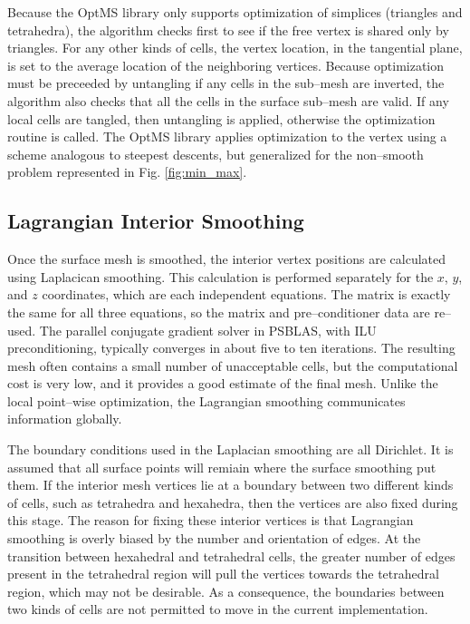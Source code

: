 \documentclass[a4paper,12pt,notitlepage]{article}
\begin{document}
Because the OptMS library only supports optimization of simplices
(triangles and tetrahedra), the algorithm checks first to see if the
free vertex is shared only by triangles.  For any other kinds of
cells, the vertex location, in the tangential plane, is set to the
average location of the neighboring vertices.  Because optimization
must be preceeded by untangling if any cells in the sub--mesh are
inverted, the algorithm also checks that all the cells in the surface
sub--mesh are valid.  If any local cells are tangled, then untangling
is applied, otherwise the optimization routine is called.  The OptMS
library applies optimization to the vertex using a scheme analogous to
steepest descents, but generalized for the non--smooth problem
represented in Fig. \ref{fig:min_max}.

\subsection{Lagrangian Interior Smoothing}
Once the surface mesh is smoothed, the interior vertex positions are
calculated using Laplacican smoothing.  This calculation is performed
separately for the $x$, $y$, and $z$ coordinates, which are each
independent equations.  The matrix is exactly the same for all three
equations, so the matrix and pre--conditioner data are re--used.  The
parallel conjugate gradient solver in PSBLAS, with ILU
preconditioning, typically converges in about five to ten iterations.
The resulting mesh often contains a small number of unacceptable
cells, but the computational cost is very low, and it provides a good
estimate of the final mesh.  Unlike the local point--wise optimization,
the Lagrangian smoothing communicates information globally.

The boundary conditions used in the Laplacian smoothing are all
Dirichlet.  It is assumed that all surface points will remiain where
the surface smoothing put them.  If the interior mesh vertices lie at
a boundary between two different kinds of cells, such as tetrahedra
and hexahedra, then the vertices are also fixed during this stage.
The reason for fixing these interior vertices is that Lagrangian
smoothing is overly biased by the number and orientation of edges.
At the transition between hexahedral and tetrahedral cells, the
greater number of edges present in the tetrahedral region will pull
the vertices towards the tetrahedral region, which may not be
desirable.  As a consequence, the boundaries between two kinds of
cells are not permitted to move in the current implementation.
\end{document}
